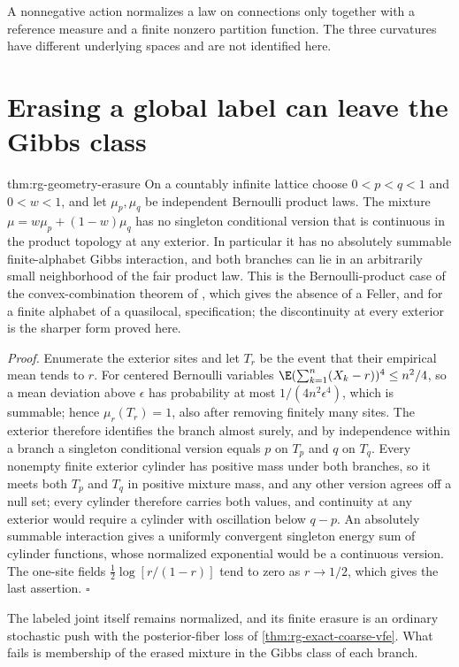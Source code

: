A nonnegative action normalizes a law on connections only together with a
reference measure and a finite nonzero partition function. The three
curvatures have different underlying spaces and are not identified here.

\section{Erasing a global label can leave the Gibbs class}
\label{sec:rg-geometry-erasure}

{thm:rg-geometry-erasure}
On a countably infinite lattice choose $0<p<q<1$ and $0<w<1$, and let
$\mu_p,\mu_q$ be independent Bernoulli product laws. The mixture
$\mu=w\mu_p+(1-w)\mu_q$ has no singleton conditional version that is
continuous in the product topology at any exterior. In particular it has no
absolutely summable finite-alphabet Gibbs interaction, and both branches can
lie in an arbitrarily small neighborhood of the fair product law. This is
the Bernoulli-product case of the convex-combination theorem of
\citet[Sec.~4.5.1, Prop.~4.12 and Cor.~4.13]{VanEnterFernandezSokal1993},
which gives the absence of a Feller, and for a finite alphabet of a
quasilocal, specification; the discontinuity at every exterior is the
sharper form proved here. 

\noindent\emph{Proof.}
Enumerate the exterior sites and let $T_r$ be the event that their empirical
mean tends to $r$. For centered Bernoulli variables
$\E(\sum_{k=1}^n(X_k-r))^4\leq n^2/4$, so a mean deviation above $\epsilon$
has probability at most $1/(4n^2\epsilon^4)$, which is summable; hence
$\mu_r(T_r)=1$, also after removing finitely many sites. The exterior
therefore identifies the branch almost surely, and by independence within a
branch a singleton conditional version equals $p$ on $T_p$ and $q$ on $T_q$.
Every nonempty finite exterior cylinder has positive mass under both
branches, so it meets both $T_p$ and $T_q$ in positive mixture mass, and any
other version agrees off a null set; every cylinder therefore carries both
values, and continuity at any exterior would require a cylinder with
oscillation below $q-p$. An absolutely summable interaction gives a uniformly
convergent singleton energy sum of cylinder functions, whose normalized
exponential would be a continuous version. The one-site fields
$\tfrac12\log[r/(1-r)]$ tend to zero as $r\to1/2$, which gives the last
assertion. $\square$

The labeled joint itself remains normalized, and its finite erasure is an
ordinary stochastic push with the posterior-fiber loss of
\cref{thm:rg-exact-coarse-vfe}. What fails is membership of the erased
mixture in the Gibbs class of each branch.

